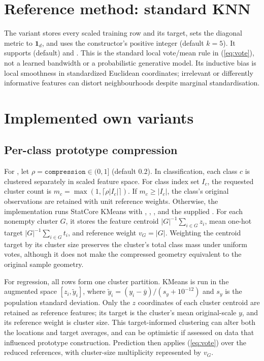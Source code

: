 \documentclass[conference]{IEEEtran}
\begin{document}
\section{Reference method: standard KNN}
\label{sec:standard}
The  variant stores every scaled training row and its target, sets the diagonal metric to $\mathbf 1_d$, and uses the constructor's positive integer  (default $k=5$). It supports  (default) and . This is the standard local vote/mean rule in (\ref{eq:vote}), not a learned bandwidth or a probabilistic generative model. Its inductive bias is local smoothness in standardized Euclidean coordinates; irrelevant or differently informative features can distort neighbourhoods despite marginal standardisation.

\section{Implemented own variants}
\subsection{Per-class prototype compression}
For , let $\rho=\texttt{compression}\in(0,1]$ (default $0.2$). In classification, each class $c$ is clustered separately in scaled feature space. For class index set $I_c$, the requested cluster count is $m_c=\max(1,\lceil\rho |I_c|\rceil)$. If $m_c\geq |I_c|$, the class's original observations are retained with unit reference weights. Otherwise, the implementation runs StatCore KMeans with , , , and the supplied . For each nonempty cluster $G$, it stores the feature centroid $|G|^{-1}\sum_{i\in G}z_i$, mean one-hot target $|G|^{-1}\sum_{i\in G}t_i$, and reference weight $v_G=|G|$. Weighting the centroid target by its cluster size preserves the cluster's total class mass under uniform votes, although it does not make the compressed geometry equivalent to the original sample geometry.

For regression, all rows form one cluster partition. KMeans is run in the augmented space $[z_i,\tilde y_i]$, where $\tilde y_i=(y_i-\bar y)/(s_y+10^{-12})$ and $s_y$ is the population standard deviation. Only the $z$ coordinates of each cluster centroid are retained as reference features; its target is the cluster's mean original-scale $y$, and its reference weight is cluster size. This target-informed clustering can alter both the locations and target averages, and can be optimistic if assessed on data that influenced prototype construction. Prediction then applies (\ref{eq:vote}) over the reduced references, with cluster-size multiplicity represented by $v_G$.
\end{document}
